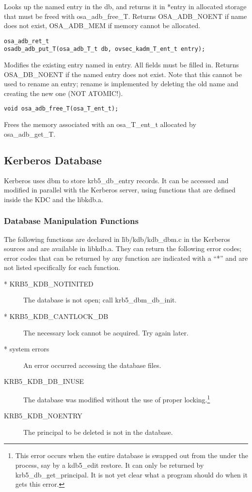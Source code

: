 Looks up the named entry in the db, and returns it in *entry in
allocated storage that must be freed with osa_adb_free_T.  Returns
OSA_ADB_NOENT if name does not exist, OSA_ADB_MEM if memory cannot be
allocated.

\begin{verbatim}
osa_adb_ret_t
osadb_adb_put_T(osa_adb_T_t db, ovsec_kadm_T_ent_t entry);
\end{verbatim}

Modifies the existing entry named in entry.  All fields must be filled
in.  Returns OSA_DB_NOENT if the named entry does not exist.  Note
that this cannot be used to rename an entry; rename is implemented by
deleting the old name and creating the new one (NOT ATOMIC!).

\begin{verbatim}
void osa_adb_free_T(osa_T_ent_t);
\end{verbatim}

Frees the memory associated with an osa_T_ent_t allocated by
osa_adb_get_T.

\subsection{Kerberos Database}

Kerberos uses dbm to store krb5_db_entry records.  It can be accessed
and modified in parallel with the Kerberos server, using functions
that are defined inside the KDC and the libkdb.a.

\subsubsection{Database Manipulation Functions}

The following functions are declared in \v{lib/kdb/kdb_dbm.c} in the
Kerberos sources and are available in libkdb.a.  They can return the
following error codes; error codes that can be returned by any
function are indicated with a ``*'' and are not listed specifically
for each function.

\begin{description}
\item[* KRB5_KDB_NOTINITED] The database is not open; call
krb5_dbm_db_init.
\item[* KRB5_KDB_CANTLOCK_DB] The necessary lock cannot be acquired.  Try
again later.
\item[* system errors] An error occurred accessing the database files.
\item[KRB5_KDB_DB_INUSE] The database was modified without the use
of proper locking.\footnote{This error occurs when the entire database
is swapped out from the under the process, say by a kdb5_edit restore.
It can only be returned by krb5_db_get_principal.  It is not yet clear
what a program should do when it gets this error.}
\item[KRB5_KDB_NOENTRY] The principal to be deleted is not
in the database.
\end{description}

